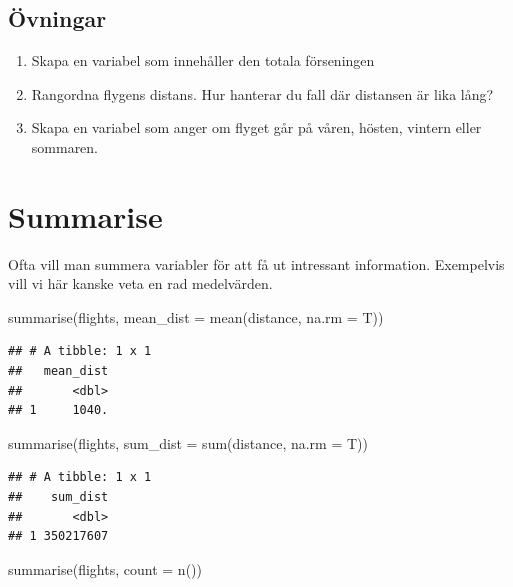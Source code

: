 \documentclass[
]{book}
\newenvironment{Shaded}{\begin{snugshade}}{\end{snugshade}}
\newcommand{\AttributeTok}[1]{\textcolor[rgb]{0.77,0.63,0.00}{#1}}
\newcommand{\FunctionTok}[1]{\textcolor[rgb]{0.00,0.00,0.00}{#1}}
\newcommand{\NormalTok}[1]{#1}
\providecommand{\tightlist}{%
  \setlength{\itemsep}{0pt}\setlength{\parskip}{0pt}}
\begin{document}
\hypertarget{uxf6vningar}{%
\subsection{Övningar}\label{uxf6vningar}}

\begin{enumerate}
\def\labelenumi{\arabic{enumi}.}
\tightlist
\item
  Skapa en variabel som innehåller den totala förseningen
\item
  Rangordna flygens distans. Hur hanterar du fall där distansen är lika lång?
\item
  Skapa en variabel som anger om flyget går på våren, hösten, vintern eller sommaren.
\end{enumerate}

\hypertarget{summarise}{%
\section{Summarise}\label{summarise}}

Ofta vill man summera variabler för att få ut intressant information. Exempelvis vill vi här kanske veta en rad medelvärden.

\begin{Shaded}
\begin{Highlighting}[]
\FunctionTok{summarise}\NormalTok{(flights, }\AttributeTok{mean\_dist =} \FunctionTok{mean}\NormalTok{(distance, }\AttributeTok{na.rm =}\NormalTok{ T))}
\end{Highlighting}
\end{Shaded}

\begin{verbatim}
## # A tibble: 1 x 1
##   mean_dist
##       <dbl>
## 1     1040.
\end{verbatim}

\begin{Shaded}
\begin{Highlighting}[]
\FunctionTok{summarise}\NormalTok{(flights, }\AttributeTok{sum\_dist =} \FunctionTok{sum}\NormalTok{(distance, }\AttributeTok{na.rm =}\NormalTok{ T))}
\end{Highlighting}
\end{Shaded}

\begin{verbatim}
## # A tibble: 1 x 1
##    sum_dist
##       <dbl>
## 1 350217607
\end{verbatim}

\begin{Shaded}
\begin{Highlighting}[]
\FunctionTok{summarise}\NormalTok{(flights, }\AttributeTok{count =} \FunctionTok{n}\NormalTok{())}
\end{Highlighting}
\end{Shaded}
\end{document}
